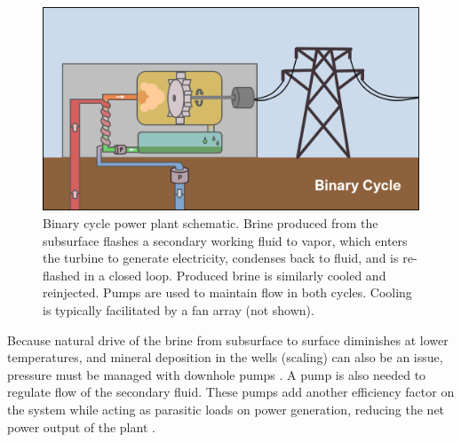 \begin{figure}%
\centering
\includegraphics[width=.9\textwidth]{templates/images/Figure-BinaryPlant_Schematic.png}
\caption[Binary cycle geothermal power plant schematic]{Binary cycle power plant schematic. Brine produced from the subsurface flashes a secondary working fluid to vapor, which enters the turbine to generate electricity, condenses back to fluid, and is re-flashed in a closed loop. Produced brine is similarly cooled and reinjected. Pumps are used to maintain flow in both cycles. Cooling is typically facilitated by a fan array (not shown).}
\label{fig:binary_plant}
\end{figure}

Because natural drive of the brine from subsurface to surface diminishes at lower temperatures, and mineral deposition in the wells (scaling) can also be an issue, pressure must be managed with downhole pumps \citep[p.\ 153]{dipippo_geothermal_2012}. A pump is also needed to regulate flow of the secondary fluid. These pumps add another efficiency factor on the system while acting as parasitic loads on power generation, reducing the net power output of the plant \citep[][Figure 2]{lowry_implications_2017}.

